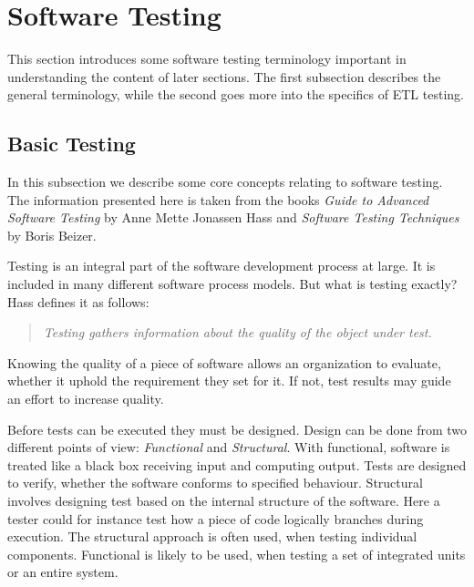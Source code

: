 \section{Software Testing}\label{sect:btesting}

This section introduces some software testing terminology important in understanding the content of later sections. The first subsection describes the general terminology, while the second goes more into the specifics of ETL testing.

\subsection{Basic Testing}
In this subsection we describe some core concepts relating to software testing. The information presented here is taken from the books \textit{Guide to Advanced Software Testing} by Anne Mette Jonassen Hass\cite{Hass} and \textit{Software Testing Techniques} by Boris Beizer\cite{Beizer}.

Testing is an integral part of the software development process at large. It is included in many different software process models. But what is testing exactly? Hass defines it as follows:
\begin{quotation} \textit{Testing gathers information about the quality of the object under test.}\end{quotation}
Knowing the quality of a piece of software allows an organization to evaluate, whether it uphold the requirement they set for it. If not, test results may guide an effort to increase quality.

Before tests can be executed they must be designed. Design can be done from two different points of view: \emph{Functional} and \emph{Structural}. With functional, software is treated like a black box receiving input and computing output. Tests are designed to verify, whether the software conforms to specified behaviour. Structural involves designing test based on the internal structure of the software. Here a tester could for instance test how a piece of code logically branches during execution. The structural approach is often used, when testing individual components. Functional is likely to be used, when testing a set of integrated units or an entire system.

